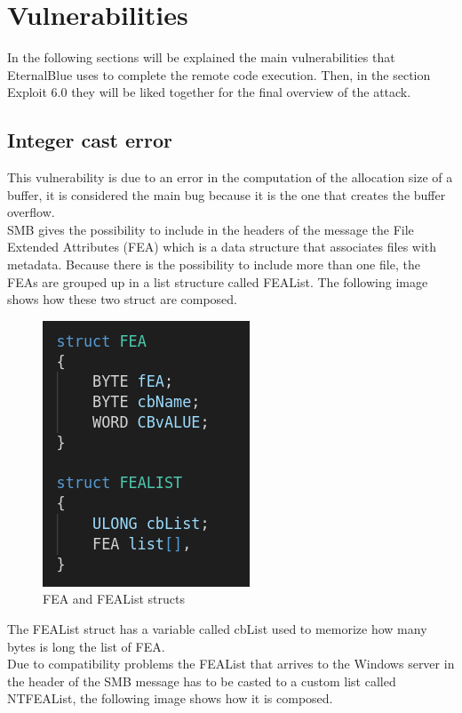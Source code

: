 \section{Vulnerabilities}
In the following sections will be explained the main vulnerabilities that EternalBlue uses to complete the remote code execution. 
Then, in the section Exploit 6.0 they will be liked together for the final overview of the attack.

\subsection{Integer cast error}
This vulnerability is due to an error in the computation of the allocation size of a buffer, it is considered the main bug because it is the one that creates the buffer overflow.\\
SMB gives the possibility to include in the headers of the message the File Extended Attributes (FEA) which is a data structure that 
associates files with metadata. Because there is the possibility to include more than one file, the FEAs are grouped up in a list structure called FEAList.
The following image shows how these two struct are composed.

\begin{figure}[ht!]
  \centering
    \includegraphics[scale=0.5]{images/FEA_code.png}
    \caption{FEA and FEAList structs}
\end{figure}
\noindent The FEAList struct has a variable called cbList used to memorize how many bytes is long the list of FEA.\\
Due to compatibility problems the FEAList that arrives to the Windows server in the header of the SMB message has to be casted to 
a custom list called NTFEAList, the following image shows how it is composed.

